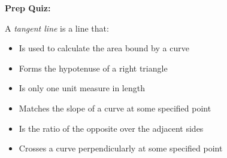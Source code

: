 \vfil \eject

\noindent
{\bf Prep Quiz:}

A {\it tangent line} is a line that:

\begin{itemize}
\item{} Is used to calculate the area bound by a curve
\vskip 5pt 
\item{} Forms the hypotenuse of a right triangle
\vskip 5pt 
\item{} Is only one unit measure in length
\vskip 5pt 
\item{} Matches the slope of a curve at some specified point
\vskip 5pt 
\item{} Is the ratio of the opposite over the adjacent sides
\vskip 5pt 
\item{} Crosses a curve perpendicularly at some specified point
\end{itemize}






